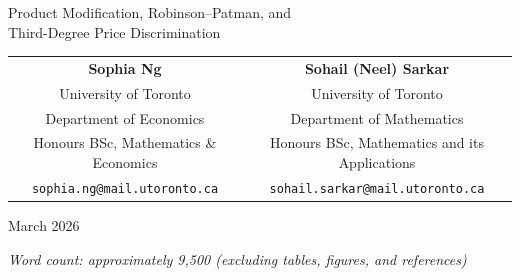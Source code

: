 \documentclass[12pt]{article}
\theoremstyle{definition}
\begin{document}
\begin{titlepage}
\centering
\vspace*{2cm}
{\LARGE Product Modification, Robinson--Patman, and\\[6pt]
Third-Degree Price Discrimination\par}
\vspace{1.8cm}
\begin{tabular}{cc}
\textbf{Sophia Ng} & \textbf{Sohail (Neel) Sarkar} \\[4pt]
University of Toronto & University of Toronto \\
Department of Economics & Department of Mathematics \\
Honours BSc, Mathematics \& Economics & Honours BSc, Mathematics and its Applications \\[6pt]
\texttt{sophia.ng@mail.utoronto.ca} & \texttt{sohail.sarkar@mail.utoronto.ca}
\end{tabular}
\vspace{1.4cm}
{\large March 2026\par}
\vfill
\textit{Word count: approximately 9,500 (excluding tables, figures, and references)}
\end{titlepage}

\newpage
{}
\setcounter{page}{1}
\end{document}
